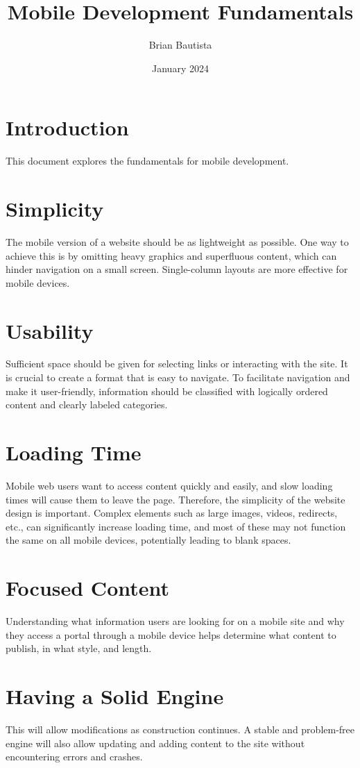 \documentclass{article}
\title{Mobile Development Fundamentals}
\author{Brian Bautista}
\date{January 2024}
\begin{document}
\maketitle

\section{Introduction}
This document explores the fundamentals for mobile development.

\section{Simplicity}
The mobile version of a website should be as lightweight as possible. One way to achieve this is by omitting heavy graphics and superfluous content, which can hinder navigation on a small screen. Single-column layouts are more effective for mobile devices.

\section{Usability}
Sufficient space should be given for selecting links or interacting with the site. It is crucial to create a format that is easy to navigate. To facilitate navigation and make it user-friendly, information should be classified with logically ordered content and clearly labeled categories.

\section{Loading Time}
Mobile web users want to access content quickly and easily, and slow loading times will cause them to leave the page. Therefore, the simplicity of the website design is important. Complex elements such as large images, videos, redirects, etc., can significantly increase loading time, and most of these may not function the same on all mobile devices, potentially leading to blank spaces.

\section{Focused Content}
Understanding what information users are looking for on a mobile site and why they access a portal through a mobile device helps determine what content to publish, in what style, and length.

\section{Having a Solid Engine}
This will allow modifications as construction continues. A stable and problem-free engine will also allow updating and adding content to the site without encountering errors and crashes.
\end{document}
